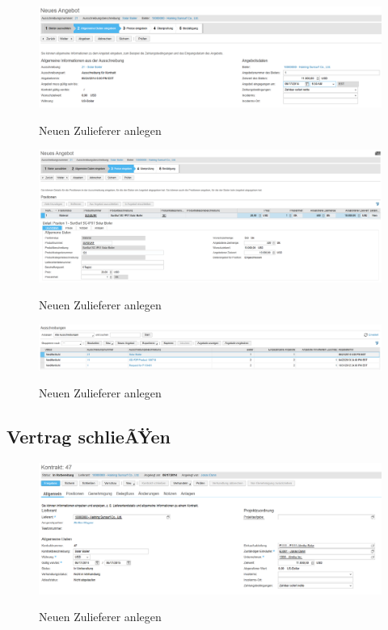 \begin{figure}[H]
	\begin{center}
	\includegraphics[width=1.0\textwidth]{grafiken/ByDesign-HowTo-Ausschreibung-4.png}
	\caption{Neuen Zulieferer anlegen}
	\vspace{-10pt}
	\label{abb:byd-newsupplier}
	\end{center}
\end{figure}
\begin{figure}[H]
	\begin{center}
	\includegraphics[width=1.0\textwidth]{grafiken/ByDesign-HowTo-Ausschreibung-5.png}
	\caption{Neuen Zulieferer anlegen}
	\vspace{-10pt}
	\label{abb:byd-newsupplier}
	\end{center}
\end{figure}
\begin{figure}[H]
	\begin{center}
	\includegraphics[width=1.0\textwidth]{grafiken/ByDesign-HowTo-Ausschreibung-6.png}
	\caption{Neuen Zulieferer anlegen}
	\vspace{-10pt}
	\label{abb:byd-newsupplier}
	\end{center}
\end{figure}

\subsection{Vertrag schlieÃŸen}
\label{contract}

\begin{figure}[H]
	\begin{center}
	\includegraphics[width=1.0\textwidth]{grafiken/ByDesign-HowTo-4.png}
	\caption{Neuen Zulieferer anlegen}
	\vspace{-10pt}
	\label{abb:byd-newsupplier}
	\end{center}
\end{figure}